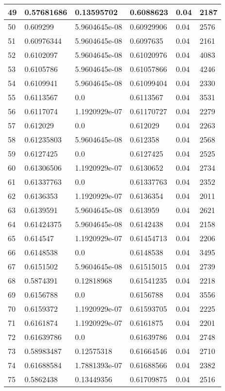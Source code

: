 \begin{longtable}{|l|l|l|l|l|l|}
49 & 0.57681686 & 0.13595702 & 0.6088623 & 0.04 & 2187 \\ \hline 
50 & 0.609299 & 5.9604645e-08 & 0.60929906 & 0.04 & 2576 \\ \hline 
51 & 0.60976344 & 5.9604645e-08 & 0.6097635 & 0.04 & 2161 \\ \hline 
52 & 0.6102097 & 5.9604645e-08 & 0.61020976 & 0.04 & 4083 \\ \hline 
53 & 0.6105786 & 5.9604645e-08 & 0.61057866 & 0.04 & 4246 \\ \hline 
54 & 0.6109941 & 5.9604645e-08 & 0.61099404 & 0.04 & 2330 \\ \hline 
55 & 0.6113567 & 0.0 & 0.6113567 & 0.04 & 3531 \\ \hline 
56 & 0.6117074 & 1.1920929e-07 & 0.61170727 & 0.04 & 2279 \\ \hline 
57 & 0.612029 & 0.0 & 0.612029 & 0.04 & 2263 \\ \hline 
58 & 0.61235803 & 5.9604645e-08 & 0.612358 & 0.04 & 2568 \\ \hline 
59 & 0.6127425 & 0.0 & 0.6127425 & 0.04 & 2525 \\ \hline 
60 & 0.61306506 & 1.1920929e-07 & 0.6130652 & 0.04 & 2734 \\ \hline 
61 & 0.61337763 & 0.0 & 0.61337763 & 0.04 & 2352 \\ \hline 
62 & 0.6136353 & 1.1920929e-07 & 0.6136354 & 0.04 & 2011 \\ \hline 
63 & 0.6139591 & 5.9604645e-08 & 0.613959 & 0.04 & 2621 \\ \hline 
64 & 0.61424375 & 5.9604645e-08 & 0.6142438 & 0.04 & 2158 \\ \hline 
65 & 0.614547 & 1.1920929e-07 & 0.61454713 & 0.04 & 2206 \\ \hline 
66 & 0.6148538 & 0.0 & 0.6148538 & 0.04 & 3495 \\ \hline 
67 & 0.6151502 & 5.9604645e-08 & 0.61515015 & 0.04 & 2739 \\ \hline 
68 & 0.5874391 & 0.12818968 & 0.61541235 & 0.04 & 2218 \\ \hline 
69 & 0.6156788 & 0.0 & 0.6156788 & 0.04 & 3556 \\ \hline 
70 & 0.6159372 & 1.1920929e-07 & 0.61593705 & 0.04 & 2225 \\ \hline 
71 & 0.6161874 & 1.1920929e-07 & 0.6161875 & 0.04 & 2201 \\ \hline 
72 & 0.61639786 & 0.0 & 0.61639786 & 0.04 & 2748 \\ \hline 
73 & 0.58983487 & 0.12575318 & 0.61664546 & 0.04 & 2710 \\ \hline 
74 & 0.61688584 & 1.7881393e-07 & 0.61688566 & 0.04 & 2382 \\ \hline 
75 & 0.5862438 & 0.13449356 & 0.61709875 & 0.04 & 2516 \\ \hline 
\end{longtable}